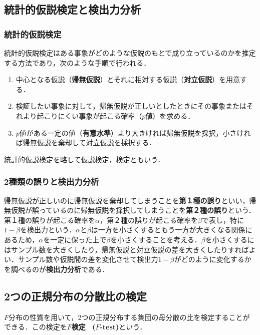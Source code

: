 \documentclass{jsarticle}
\begin{document}
\subsection{統計的仮説検定と検出力分析}
\subsubsection{統計的仮説検定}
統計的仮説検定はある事象がどのような仮説のもとで成り立っているのかを推定する方法であり，次のような手順で行われる．
\begin{enumerate}
\item 中心となる仮説（\textbf{帰無仮説}）とそれに相対する仮説（\textbf{対立仮説}）を用意する．
\item 検証したい事象に対して，帰無仮説が正しいとしたときにその事象またはそれより起こりにくい事象が起こる確率（\textbf{$p$値}）を求める．
\item $p$値がある一定の値（\textbf{有意水準}）より大きければ帰無仮説を採択，小さければ帰無仮説を棄却して対立仮説を採択する．
\end{enumerate}
統計的仮説検定を略して仮説検定，検定ともいう．

\subsubsection{2種類の誤りと検出力分析}
帰無仮説が正しいのに帰無仮説を棄却してしまうことを\textbf{第１種の誤り}といい，帰無仮説が誤っているのに帰無仮説を採択してしまうことを\textbf{第２種の誤り}という．第１種の誤りが起こる確率を$\alpha$，第２種の誤りが起こる確率を$\beta$で表し，特に$1-\beta$を検出力という．$\alpha$と$\beta$は一方を小さくするともう一方が大きくなる関係にあるため，$\alpha$を一定に保った上で$\beta$を小さくすることを考える．$\beta$を小さくするにはサンプル数を大きくしたり，帰無仮説と対立仮説の差を大きくしたりすればよい．サンプル数や仮説間の差を変化させて検出力$1-\beta$がどのように変化するかを調べるのが\textbf{検出力分析}である．


\subsection{2つの正規分布の分散比の検定} \label{ftest}
$F$分布の性質を用いて，2つの正規分布する集団の母分散の比を検定することができる．この検定を\textbf{$F$検定 \ ($F$-test)}という．
\end{document}
